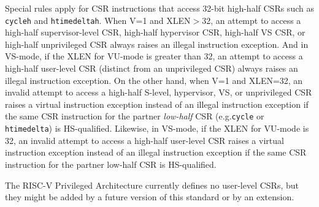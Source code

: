Special rules apply for CSR instructions that access \mbox{32-bit}
high-half CSRs such as {\tt cycleh} and {\tt htimedeltah}.
When V=1 and XLEN$>$32, an attempt to access a high-half
supervisor-level CSR, high-half hypervisor CSR, high-half VS CSR,
or high-half unprivileged CSR always raises an illegal instruction
exception.
And in VS-mode, if the XLEN for VU-mode is greater than 32, an attempt
to access a high-half user-level CSR (distinct from an unprivileged
CSR) always raises an illegal instruction exception.
On the other hand, when V=1 and XLEN=32, an invalid attempt to access a
high-half S-level, hypervisor, VS, or unprivileged CSR raises a virtual
instruction exception instead of an illegal instruction exception
if the same CSR instruction for the partner \textit{low-half} CSR
(e.g.\@ {\tt cycle} or {\tt htimedelta}) is HS-qualified.
Likewise, in VS-mode, if the XLEN for VU-mode is 32, an invalid attempt
to access a high-half user-level CSR raises a virtual instruction
exception instead of an illegal instruction exception if the same CSR
instruction for the partner low-half CSR is HS-qualified.

\begin{commentary}
The RISC-V Privileged Architecture currently defines no user-level
CSRs, but they might be added by a future version of this standard or
by an extension.
\end{commentary}

